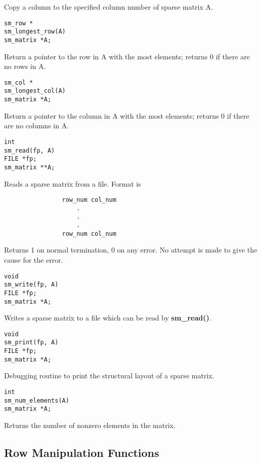         Copy a column to the specified column number of sparse matrix A.


\begin{verbatim}
sm_row *
sm_longest_row(A)
sm_matrix *A;
\end{verbatim}

        Return a pointer to the row in A with the most elements; returns
        0 if there are no rows in A.


\begin{verbatim}
sm_col *
sm_longest_col(A)
sm_matrix *A;
\end{verbatim}

        Return a pointer to the column in A with the most elements; returns
        0 if there are no columns in A.


\begin{verbatim}
int
sm_read(fp, A)
FILE *fp;
sm_matrix **A;
\end{verbatim}

        Reads a sparse matrix from a file.  Format is

\begin{verbatim}
                row_num col_num
                    .
                    .
                    .
                row_num col_num
\end{verbatim}

        Returns 1 on normal termination, 0 on any error.  No attempt is made
        to give the cause for the error.


\begin{verbatim}
void
sm_write(fp, A)
FILE *fp;
sm_matrix *A;
\end{verbatim}

        Writes a sparse matrix to a file which can be read by
        {\bf sm\_read()}.


\begin{verbatim}
void
sm_print(fp, A)
FILE *fp;
sm_matrix *A;
\end{verbatim}

        Debugging routine to print the structural layout of a sparse matrix.


\begin{verbatim}
int
sm_num_elements(A)
sm_matrix *A;
\end{verbatim}

        Returns the number of nonzero elements in the matrix.

\subsection{Row Manipulation Functions}

